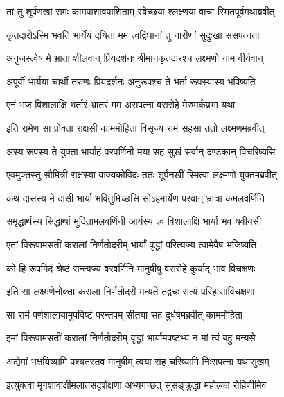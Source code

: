 
\twolineshloka
{तां तु शूर्पणखां रामः कामपाशावपाशिताम्}
{स्वेच्छया श्लक्ष्णया वाचा स्मितपूर्वमथाब्रवीत्} %

\twolineshloka
{कृतदारोऽस्मि भवति भार्येयं दयिता मम}
{त्वद्विधानां तु नारीणां सुदुःखा ससपत्नता} %

\twolineshloka
{अनुजस्त्वेष मे भ्राता शीलवान् प्रियदर्शनः}
{श्रीमानकृतदारश्च लक्ष्मणो नाम वीर्यवान्} %

\twolineshloka
{अपूर्वी भार्यया चार्थी तरुणः प्रियदर्शनः}
{अनुरूपश्च ते भर्ता रूपस्यास्य भविष्यति} %

\twolineshloka
{एनं भज विशालाक्षि भर्तारं भ्रातरं मम}
{असपत्ना वरारोहे मेरुमर्कप्रभा यथा} %

\twolineshloka
{इति रामेण सा प्रोक्ता राक्षसी काममोहिता}
{विसृज्य रामं सहसा ततो लक्ष्मणमब्रवीत्} %

\twolineshloka
{अस्य रूपस्य ते युक्ता भार्याहं वरवर्णिनी}
{मया सह सुखं सर्वान् दण्डकान् विचरिष्यसि} %

\twolineshloka
{एवमुक्तस्तु सौमित्री राक्षस्या वाक्यकोविदः}
{ततः शूर्पनखीं स्मित्वा लक्ष्मणो युक्तमब्रवीत्} %

\twolineshloka
{कथं दासस्य मे दासी भार्या भवितुमिच्छसि}
{सोऽहमार्येण परवान् भ्रात्रा कमलवर्णिनि} %

\twolineshloka
{समृद्धार्थस्य सिद्धार्था मुदितामलवर्णिनी}
{आर्यस्य त्वं विशालाक्षि भार्या भव यवीयसी} %

\twolineshloka
{एतां विरूपामसतीं करालां निर्णतोदरीम्}
{भार्यां वृद्धां परित्यज्य त्वामेवैष भजिष्यति} %

\twolineshloka
{को हि रूपमिदं श्रेष्ठं सन्त्यज्य वरवर्णिनि}
{मानुषीषु वरारोहे कुर्याद् भावं विचक्षणः} %

\twolineshloka
{इति सा लक्ष्मणेनोक्ता कराला निर्णतोदरी}
{मन्यते तद्वचः सत्यं परिहासाविचक्षणा} %

\twolineshloka
{सा रामं पर्णशालायामुपविष्टं परन्तपम्}
{सीतया सह दुर्धर्षमब्रवीत् काममोहिता} %

\twolineshloka
{इमां विरूपामसतीं करालां निर्णतोदरीम्}
{वृद्धां भार्यामवष्टभ्य न मां त्वं बहु मन्यसे} %

\twolineshloka
{अद्येमां भक्षयिष्यामि पश्यतस्तव मानुषीम्}
{त्वया सह चरिष्यामि निःसपत्ना यथासुखम्} %

\twolineshloka
{इत्युक्त्वा मृगशावाक्षीमलातसदृशेक्षणा}
{अभ्यगच्छत् सुसङ्क्रुद्धा महोल्का रोहिणीमिव} %

